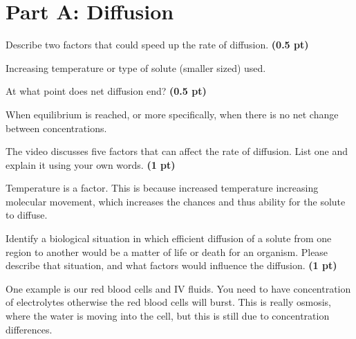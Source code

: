 \documentclass[12pt,a4paper]{article}
\begin{document}
\section*{Part A: Diffusion}
\begin{enumerate}[font=\bfseries, wide]
    {\color{under}\item Describe two factors that could speed up the rate of diffusion. \textbf{(0.5 pt)}}

    Increasing temperature or type of solute (smaller sized) used.

    {\color{under}\item At what point does net diffusion end? \textbf{(0.5 pt)}}

    When equilibrium is reached, or more specifically, when there is no net change between concentrations. 

    {\color{under}\item  The video discusses five factors that can affect the rate of diffusion. List one and explain it using your own words. \textbf{(1 pt)}}

    Temperature is a factor. This is because increased temperature increasing molecular movement, which increases the chances and thus ability for the solute to diffuse. 
    
    {\color{under}\item Identify a biological situation in which efficient diffusion of a solute from one region to another would be a matter of life or death for an organism. Please describe that situation, and what factors would influence the diffusion. \textbf{(1 pt)}}

    One example is our red blood cells and IV fluids. You need to have concentration of electrolytes otherwise the red blood cells will burst. This is really osmosis, where the water is moving into the cell, but this is still due to concentration differences.

\end{enumerate}
\end{document}
